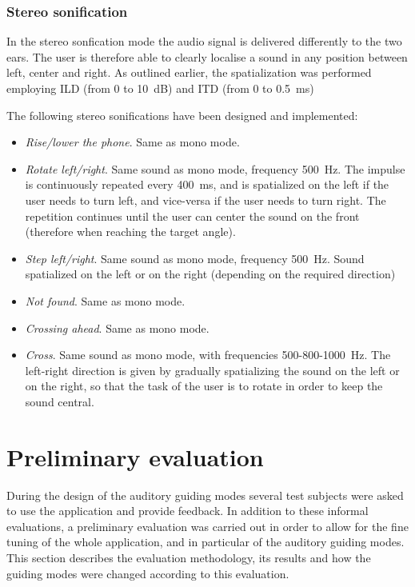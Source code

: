\documentclass{article}
\begin{document}
\subsubsection{Stereo sonification}
\label{sub:stereo}

In the stereo sonfication mode the audio signal is delivered differently to the two ears. The user is therefore able to clearly localise a sound in any position between left, center and right. As outlined earlier, the spatialization was performed employing ILD (from 0 to 10~dB) and ITD (from 0 to 0.5~ms)

The following stereo sonifications have been designed and implemented:

\begin{itemize}
\item \emph{Rise/lower the phone}. Same as mono mode.
\item \emph{Rotate left/right}. Same sound as mono mode, frequency 500~Hz. The impulse is continuously repeated every 400~ms, and is spatialized on the left if the user needs to turn left, and vice-versa if the user needs to turn right. The repetition continues until the user can center the sound on the front (therefore when reaching the target angle).
\item \emph{Step left/right}. Same sound as mono mode, frequency 500~Hz. Sound spatialized on the left or on the right (depending on the required direction)
\item \emph{Not found}. Same as mono mode.
\item \emph{Crossing ahead}. Same as mono mode.
\item \emph{Cross}. Same sound as mono mode, with frequencies 500-800-1000~Hz. The left-right direction is given by gradually spatializing the sound on the left or on the right, so that the task of the user is to rotate in order to keep the sound central.

\end{itemize}



\section{Preliminary evaluation}
\label{sec:intEval}
During the design of the auditory guiding modes several test subjects were asked to use the application and provide feedback.
In addition to these informal evaluations, a preliminary evaluation was carried out in order to allow for the fine tuning of the whole application, and in particular of the auditory guiding modes.
This section describes the evaluation methodology, its results and how the guiding modes were changed according to this evaluation.
\end{document}
